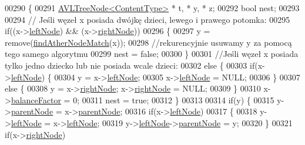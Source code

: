 \begin{DoxyCode}
00290     \{
00291       \hyperlink{class_a_v_l_tree_node}{AVLTreeNode<ContentType>} * t, * y, * z;
00292       \textcolor{keywordtype}{bool} nest;
00293 
00294       \textcolor{comment}{// Jeśli węzeł x posiada dwójkę dzieci, lewego i prawego potomka:}
00295       \textcolor{keywordflow}{if}((x->\hyperlink{class_a_v_l_tree_node_afc53d4774f375c23795c9eb598f4d7cd}{leftNode}) && (x->\hyperlink{class_a_v_l_tree_node_a51dfb148f27625c89a3a153760517c38}{rightNode}))
00296       \{
00297         y = \textcolor{keyword}{remove}(\hyperlink{class_a_v_l_tree_aa776fe15518d516032ca6d4522d77b02}{findAtherNodeMatch}(x));
00298         \textcolor{comment}{//rekurencyjnie usuwamy y za pomocą tego samego algorytmu}
00299         nest = \textcolor{keyword}{false};
00300       \}
00301       \textcolor{comment}{//Jeśli węzeł x posiada tylko jedno dziecko lub nie posiada wcale dzieci:}
00302       \textcolor{keywordflow}{else}  \{
00303         \textcolor{keywordflow}{if}(x->\hyperlink{class_a_v_l_tree_node_afc53d4774f375c23795c9eb598f4d7cd}{leftNode}) \{
00304           y = x->\hyperlink{class_a_v_l_tree_node_afc53d4774f375c23795c9eb598f4d7cd}{leftNode};
00305           x->\hyperlink{class_a_v_l_tree_node_afc53d4774f375c23795c9eb598f4d7cd}{leftNode} = NULL;
00306         \}
00307         \textcolor{keywordflow}{else} \{
00308           y = x->\hyperlink{class_a_v_l_tree_node_a51dfb148f27625c89a3a153760517c38}{rightNode}; x->\hyperlink{class_a_v_l_tree_node_a51dfb148f27625c89a3a153760517c38}{rightNode} = NULL;
00309         \}
00310         x->\hyperlink{class_a_v_l_tree_node_a212c57dab467b42c3ddc50b2aecc05ad}{balanceFactor} = 0;
00311         nest = \textcolor{keyword}{true};
00312       \}
00313 
00314       \textcolor{keywordflow}{if}(y)  \{
00315         y->\hyperlink{class_a_v_l_tree_node_ae64d1261fea217d3e85928e7cf2a9151}{parentNode} = x->\hyperlink{class_a_v_l_tree_node_ae64d1261fea217d3e85928e7cf2a9151}{parentNode};
00316         \textcolor{keywordflow}{if}(x->\hyperlink{class_a_v_l_tree_node_afc53d4774f375c23795c9eb598f4d7cd}{leftNode})
00317                 \{
00318                         y->\hyperlink{class_a_v_l_tree_node_afc53d4774f375c23795c9eb598f4d7cd}{leftNode}  = x->\hyperlink{class_a_v_l_tree_node_afc53d4774f375c23795c9eb598f4d7cd}{leftNode};
00319                         y->\hyperlink{class_a_v_l_tree_node_afc53d4774f375c23795c9eb598f4d7cd}{leftNode}->\hyperlink{class_a_v_l_tree_node_ae64d1261fea217d3e85928e7cf2a9151}{parentNode}  = y;
00320                 \}
00321         \textcolor{keywordflow}{if}(x->\hyperlink{class_a_v_l_tree_node_a51dfb148f27625c89a3a153760517c38}{rightNode})

\end{DoxyCode}
